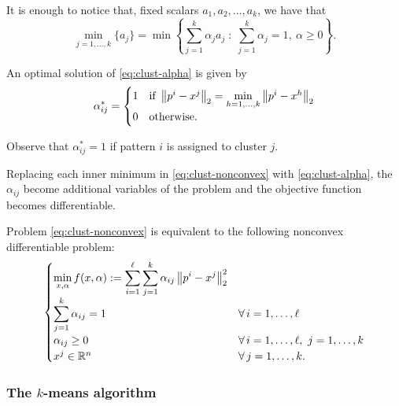 \begin{remark}
It is enough to notice that, fixed scalars $a_1,a_2,\dots,a_k$, we have that
\[
\min_{j=1,\dots,k} \{a_j\} = \min\left\{ \sum_{j=1}^{k} \alpha_j a_j \;:\; \sum_{j=1}^{k} \alpha_j = 1,\ \alpha \ge 0 \right\}.
\]
\end{remark}

An optimal solution of \eqref{eq:clust-alpha} is given by
\begin{equation}\label{eq:clust-alpha-opt}
\alpha_{ij}^* =
\begin{cases}
1 & \text{if } \left\lVert p^i - x^j \right\rVert_2 = \min\limits_{h=1,\dots,k} \left\lVert p^i - x^h \right\rVert_2\\
0 & \text{otherwise.}
\end{cases}
\end{equation}

\begin{remark}
Observe that $\alpha_{ij}^* = 1$ if pattern $i$ is assigned to cluster $j$.
\end{remark}

Replacing each inner minimum in \eqref{eq:clust-nonconvex} with \eqref{eq:clust-alpha}, the $\alpha_{ij}$ become additional variables of the problem and the objective function becomes differentiable.

\begin{theorem}
Problem \eqref{eq:clust-nonconvex} is equivalent to the following nonconvex differentiable problem:
\begin{equation}\label{eq:clust-diff}
\begin{cases}
\displaystyle \min_{x,\alpha} f(x,\alpha) := \sum_{i=1}^{\ell}\sum_{j=1}^{k} \alpha_{ij}\left\lVert p^i - x^j \right\rVert_2^2\\[1ex]
\displaystyle \sum_{j=1}^{k} \alpha_{ij} = 1 & \forall\, i=1,\dots,\ell\\[1ex]
\alpha_{ij} \ge 0 & \forall\, i=1,\dots,\ell,\ j=1,\dots,k\\
x^j \in \mathbb{R}^n & \forall\, j=1,\dots,k.
\end{cases}
\end{equation}
\end{theorem}

\subsubsection{The \texorpdfstring{$k$}{k}-means algorithm}

